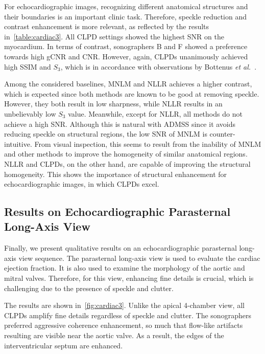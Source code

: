 For echocardiographic images, recognizing different anatomical structures and their boundaries is an important clinic task.
Therefore, speckle reduction and contrast enhancement is more relevant, as reflected by the results in~\cref{table:cardiac3}.
All CLPD settings showed the highest SNR on the myocardium.
In terms of contrast, sonographers B and F showed a preference towards high gCNR and CNR.
However, again, CLPDs unanimously achieved high SSIM and \(S_3\), which is in accordance with observations by Bottenus \textit{et al.}~\cite{bottenus_resolution_2021}.

Among the considered baselines, MNLM and NLLR achieves a higher contrast, which is expected since both methods are known to be good at removing speckle.
However, they both result in low sharpness, while NLLR results in an unbelievably low \(S_3\) value.
Meanwhile, except for NLLR, all methods do not achieve a high SNR.
Although this is natural with ADMSS since it avoids reducing speckle on structural regions, the low SNR of MNLM is counter-intuitive.
From visual inspection, this seems to result from the inability of MNLM and other methods to improve the homogeneity of similar anatomical regions.
NLLR and CLPDs, on the other hand, are capable of improving the structural homogeneity.
This shows the importance of structural enhancement for echocardiographic images, in which CLPDs excel.

\vspace{-0.1in}
\subsection{Results on Echocardiographic Parasternal Long-Axis View}
Finally, we present qualitative results on an echocardiographic parasternal long-axis view sequence.
The parasternal long-axis view is used to evaluate the cardiac ejection fraction.
It is also used to examine the morphology of the aortic and mitral valves.
Therefore, for this view, enhancing fine details is crucial, which is challenging due to the presence of speckle and clutter.

The results are shown in~\cref{fig:cardiac3}.
Unlike the apical 4-chamber view, all CLPDs amplify fine details regardless of speckle and clutter.
The sonographers preferred aggressive coherence enhancement, so much that flow-like artifacts resulting are visible near the aortic valve.
As a result, the edges of the interventricular septum are enhanced.

